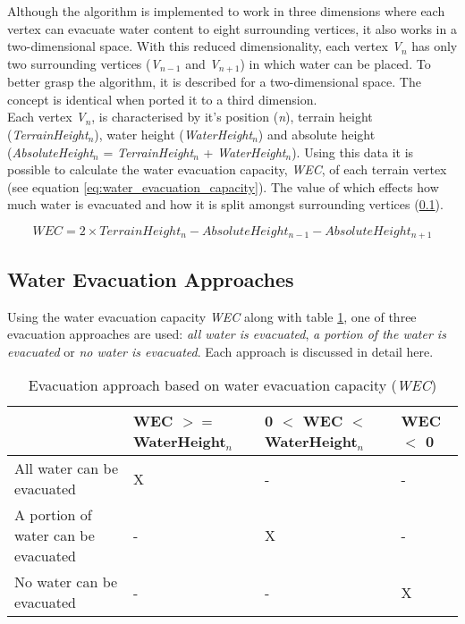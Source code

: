 Although the algorithm is implemented to work in three dimensions where each vertex can evacuate water content to eight surrounding vertices, it also works in a two-dimensional space. With this reduced dimensionality, each vertex \textit{V$_{n}$} has only two surrounding vertices (\textit{V$_{n-1}$} and \textit{V$_{n+1}$}) in which water can be placed. To better grasp the algorithm, it is described for a two-dimensional space. The concept is identical when ported it to a third dimension.  \\

Each vertex \textit{V$_{n}$}, is characterised by it's position (\textit{n}), terrain height (\textit{TerrainHeight$_{n}$}), water height (\textit{WaterHeight$_{n}$}) and absolute height (\textit{AbsoluteHeight$_{n}$} = \textit{TerrainHeight$_{n}$} + \textit{WaterHeight$_{n}$}). Using this data it is possible to calculate the water evacuation capacity, \textit{WEC}, of each terrain vertex (see equation \ref{eq:water_evacuation_capacity}). The value of which effects how much water is evacuated and how it is split amongst surrounding vertices (\ref{subsec:evacuation_approaches}).

\begin{equation} \label{eq:water_evacuation_capacity}
	WEC = 2 \times TerrainHeight_{n} - AbsoluteHeight_{n-1} - AbsoluteHeight_{n+1}
\end{equation}


\subsection{Water Evacuation Approaches} \label{subsec:evacuation_approaches}

Using the water evacuation capacity \textit{WEC} along with table \ref{tab:scenario_based_on_wec}, one of three evacuation approaches are used:  \textit{all water is evacuated}, \textit{a portion of the water is evacuated} or \textit{no water is evacuated}. Each approach is discussed in detail here. \\

\begin{table}[h]
  \centering
	    \begin{tabular}{|p{6cm}|p{3cm}|p{3cm}|p{3cm}|}
		\hline	
  	     &  WEC $>=$ WaterHeight$_{n}$ & 0 $<$ WEC $<$ WaterHeight$_{n}$ & WEC $<$ 0 \\
  	    \hline	
  	    All water can be evacuated & X & - & - \\
		\hline
  	    A portion of water can be evacuated & - & X & - \\
		\hline
  	    No water can be evacuated & - & - & X \\
		\hline
		\end{tabular}
		\caption{Evacuation approach based on water evacuation capacity (\textit{WEC})}
	  \label{tab:scenario_based_on_wec}
\end{table}

